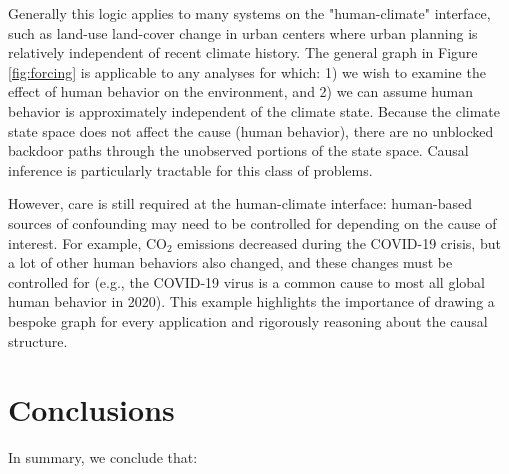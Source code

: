 \documentclass[12pt]{article}
\begin{document}
Generally this logic applies to many systems on the "human-climate"
interface, such as land-use land-cover change in urban centers where
urban planning is relatively independent of recent climate
history. The general graph in Figure \ref{fig:forcing} is applicable
to any analyses for which: 1) we wish to examine the effect of human
behavior on the environment, and 2) we can assume human behavior is
approximately independent of the climate state. Because the climate
state space does not affect the cause (human behavior), there are no
unblocked backdoor paths through the unobserved portions of the state
space. Causal inference is particularly tractable for this class of
problems.

However, care is still required at the human-climate interface:
human-based sources of confounding may need to be controlled for
depending on the cause of interest. For example, CO$_2$ emissions
decreased during the COVID-19 crisis, but a lot of other human
behaviors also changed, and these changes must be controlled for
(e.g., the COVID-19 virus is a common cause to most all global human
behavior in 2020). This example highlights the importance of drawing a
bespoke graph for every application and rigorously reasoning about the
causal structure.

\section{Conclusions}

In summary, we conclude that:
\end{document}
